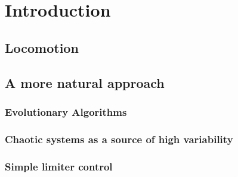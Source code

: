 \documentclass[main]{subfiles}
\begin{document}
\setcounter{chapter}{0}

\chapter{Introduction} %

\label{Chapter\thechapter} %


\section{Locomotion}

\lipsum[1]

\section{A more natural approach}

\lipsum[1]

\subsection{Evolutionary Algorithms}

\lipsum[1]

\subsection{Chaotic systems as a source of high variability}

\lipsum[1]

\subsection{Simple limiter control}

\lipsum[1]

\end{document}
